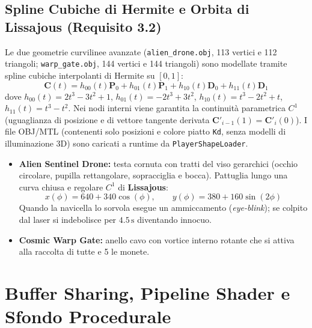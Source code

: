\documentclass[11pt,a4paper]{article}
\begin{document}
\subsection{Spline Cubiche di Hermite e Orbita di Lissajous (Requisito 3.2)}
Le due geometrie curvilinee avanzate (\texttt{alien\_drone.obj}, 113 vertici e 112 triangoli; \texttt{warp\_gate.obj}, 144 vertici e 144 triangoli) sono modellate tramite spline cubiche interpolanti di Hermite su $[0, 1]$:
\[
\mathbf{C}(t) = h_{00}(t)\mathbf{P}_0 + h_{01}(t)\mathbf{P}_1 + h_{10}(t)\mathbf{D}_0 + h_{11}(t)\mathbf{D}_1
\]
dove $h_{00}(t)=2t^3-3t^2+1$, $h_{01}(t)=-2t^3+3t^2$, $h_{10}(t)=t^3-2t^2+t$, $h_{11}(t)=t^3-t^2$. Nei nodi interni viene garantita la continuità parametrica $C^1$ (uguaglianza di posizione e di vettore tangente derivata $\mathbf{C}'_{i-1}(1)=\mathbf{C}'_i(0)$). I file OBJ/MTL (contenenti solo posizioni e colore piatto \texttt{Kd}, senza modelli di illuminazione 3D) sono caricati a runtime da \texttt{PlayerShapeLoader}.
\begin{itemize}
    \item \textbf{Alien Sentinel Drone:} testa cornuta con tratti del viso gerarchici (occhio circolare, pupilla rettangolare, sopracciglia e bocca). Pattuglia lungo una curva chiusa e regolare $C^1$ di \textbf{Lissajous}:
    \[
    x(\phi) = 640 + 340\cos(\phi), \qquad y(\phi) = 380 + 160\sin(2\phi)
    \]
    Quando la navicella lo sorvola esegue un ammiccamento (\textit{eye-blink}); se colpito dal laser si indebolisce per $4.5\,\text{s}$ diventando innocuo.
    \item \textbf{Cosmic Warp Gate:} anello cavo con vortice interno rotante che si attiva alla raccolta di tutte e 5 le monete.
\end{itemize}

\section{Buffer Sharing, Pipeline Shader e Sfondo Procedurale}
\end{document}

